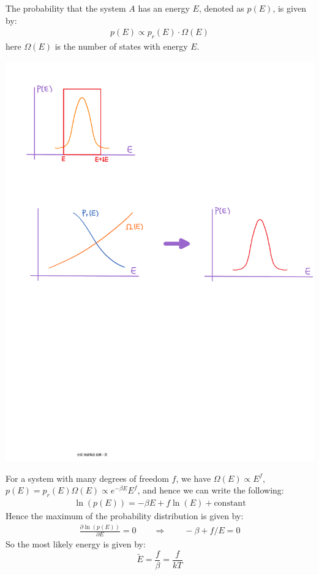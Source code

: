 \documentclass[11pt,oneside]{book}
\theoremstyle{break}
\theoremstyle{break}
\begin{document}
The probability that the system $A$ has an energy $E$, denoted as $p(E)$, is given by:
\begin{align*}
p(E) \propto p_r(E) \cdot \Omega(E)
\end{align*}
here $\Omega(E)$ is the number of states with energy $E$. \\

\begin{center}
\includegraphics[scale=0.65]{canEnsemble.pdf}
\end{center}

For a system with many degrees of freedom $f$, we have $\Omega(E) \propto E^f$, $p(E) = p_r(E) \Omega(E) \propto e^{-\beta E} E^f$, and hence we can write the following:
\begin{align*}
 \ln(p(E)) = -\beta E + f\ln(E) + \text{constant}
\end{align*}
Hence the maximum of the probability distribution is given by:
\begin{align*}
\frac{\partial \ln(p(E))}{\partial E} = 0 \qquad \Rightarrow \qquad -\beta + f/E = 0
\end{align*}
So the most likely energy is given by: 
$$\widetilde{E} = \frac{f}{\beta} = \frac{f}{kT}$$\\
\end{document}
